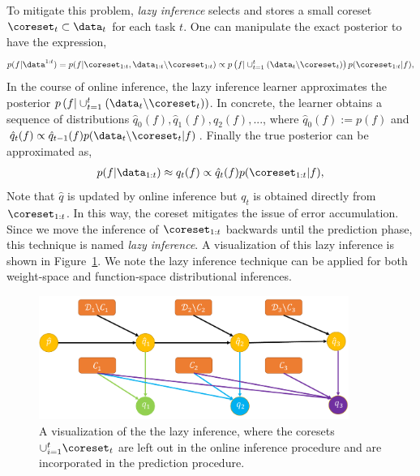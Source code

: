 To mitigate this problem, \textit{lazy inference} selects and stores a small coreset $\coreset_{t} \subset \data_t$ for each task $t$. One can manipulate the exact posterior to have the expression,
\begin{align}
    p(f | \data^{1:t}) = p(f | \coreset_{1:t}, \data_{1:t} \backslash \coreset_{1:t}) \propto p\left(f | \cup_{t=1}^t (\data_t \backslash \coreset_t)\right) p(\coreset_{1:t} | f),
\end{align}
In the course of online inference, the lazy inference learner approximates the posterior $p\left(f | \cup_{t=1}^t (\data_t \backslash \coreset_t)\right)$. In concrete, the learner obtains a sequence of distributions $\hat{q}_0(f), \hat{q}_1(f), \hat{q}_2(f), ...$, where  $\hat{q}_0(f) := p(f)$ and $\hat{q}_{t}(f) \propto \hat{q}_{t-1}(f) p(\data_{t} \backslash \coreset_{t}|f)$. Finally the true posterior can be approximated as,
\begin{align}
    p(f | \data_{1:t}) \approx q_t(f) \propto \hat{q}_t(f) p(\coreset_{1:t} | f),
\end{align}
Note that $\hat{q}$ is updated by online inference but $q_t$ is obtained directly from $\coreset_{1:t}$. In this way, the coreset mitigates the issue of error accumulation. Since we move the inference of $\coreset_{1:t}$ backwards until the prediction phase, this technique is named \emph{lazy inference}. A visualization of this lazy inference is shown in Figure~\ref{fig:online-inference-1}. We note the lazy inference technique can be applied for both weight-space \citep{nguyen2017variational} and function-space distributional inferences.

\begin{figure}
\centering
\includegraphics[width=0.9\textwidth]{figures/lazy-inference-2.pdf}
\caption{A visualization of the  the lazy inference, where the coresets $\cup_{i=1}^t \coreset_t$ are left out in the online inference procedure and are incorporated in the prediction procedure.\label{fig:online-inference-1}}
\end{figure}


